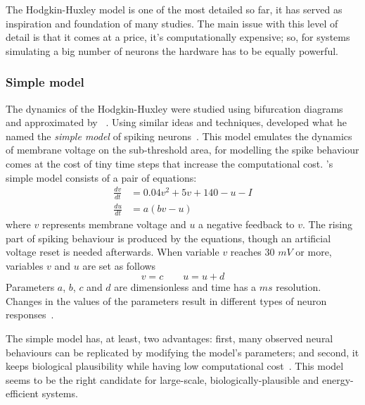 The Hodgkin-Huxley model is one of the most detailed so far, it has served as inspiration and foundation of many studies. The main issue with this level of detail is that it comes at a price, it's computationally expensive; so, for systems simulating a big number of neurons the hardware has to be equally powerful.

\subsubsection{Simple model}
The dynamics of the Hodgkin-Huxley were studied using bifurcation diagrams and approximated by \citeauthor{fitzhugh1961impulses}~\cite{fitzhugh1961impulses}. Using similar ideas and techniques, \citeauthor{izhikevich2003simple} developed what he named the \emph{simple model} of spiking neurons~\cite{izhikevich2003simple}. This model emulates the dynamics of membrane voltage on the sub-threshold area, for modelling the spike behaviour comes at the cost of tiny time steps that increase the computational cost. \citeauthor{izhikevich2003simple}'s simple model consists of a pair of equations:
\begin{align}
  \frac{dv}{dt} &= 0.04v^{2} + 5v + 140 - u - I \\[0.5em]
  \frac{du}{dt} &= a(bv - u)
\end{align}
where $v$ represents membrane voltage and $u$ a negative feedback to $v$. The rising part of spiking behaviour is produced by the equations, though an artificial voltage reset is needed afterwards. When variable $v$ reaches 30 $mV$ or more, variables $v$ and $u$ are set as follows
\begin{equation}
  v = c \qquad u = u + d
\end{equation}
Parameters $a$, $b$, $c$ and $d$ are dimensionless and time has a $ms$ resolution. Changes in  the values of the parameters result in different types of neuron responses~\cite{dynamical-systems-Izhikevich2007}. 

The simple model has, at least, two advantages: first, many observed neural behaviours can be replicated by modifying the model's parameters; and second, it keeps biological plausibility while having low computational cost~\cite{izhikevich2004model}. This model seems to be the right candidate for large-scale, biologically-plausible and energy-efficient systems.













